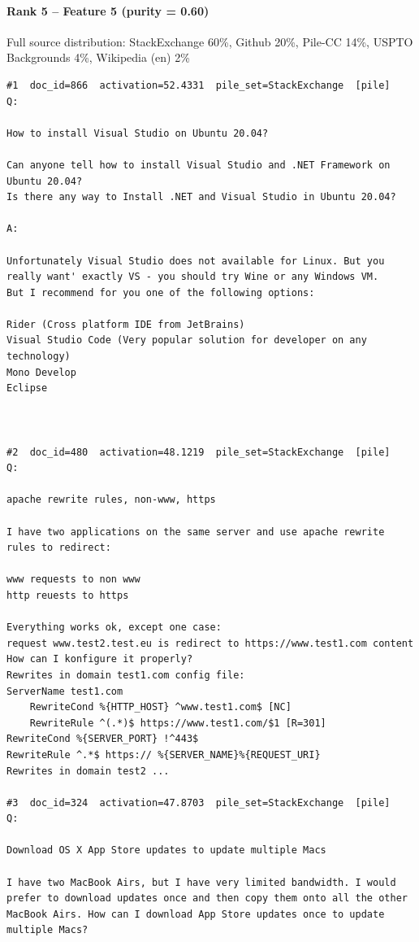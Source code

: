 \paragraph*{Rank 5 -- Feature 5 (purity = 0.60)}

Full source distribution: StackExchange 60\%, Github 20\%, Pile-CC 14\%, USPTO Backgrounds 4\%, Wikipedia (en) 2\%

\begin{verbatim}
#1  doc_id=866  activation=52.4331  pile_set=StackExchange  [pile]
Q:

How to install Visual Studio on Ubuntu 20.04?

Can anyone tell how to install Visual Studio and .NET Framework on Ubuntu 20.04?
Is there any way to Install .NET and Visual Studio in Ubuntu 20.04?

A:

Unfortunately Visual Studio does not available for Linux. But you really want' exactly VS - you should try Wine or any Windows VM.
But I recommend for you one of the following options:

Rider (Cross platform IDE from JetBrains)
Visual Studio Code (Very popular solution for developer on any technology)
Mono Develop
Eclipse



#2  doc_id=480  activation=48.1219  pile_set=StackExchange  [pile]
Q:

apache rewrite rules, non-www, https

I have two applications on the same server and use apache rewrite rules to redirect:

www requests to non www
http reuests to https

Everything works ok, except one case:
request www.test2.test.eu is redirect to https://www.test1.com content
How can I konfigure it properly?
Rewrites in domain test1.com config file: 
ServerName test1.com
    RewriteCond %{HTTP_HOST} ^www.test1.com$ [NC]
    RewriteRule ^(.*)$ https://www.test1.com/$1 [R=301]
RewriteCond %{SERVER_PORT} !^443$
RewriteRule ^.*$ https:// %{SERVER_NAME}%{REQUEST_URI}
Rewrites in domain test2 ...

#3  doc_id=324  activation=47.8703  pile_set=StackExchange  [pile]
Q:

Download OS X App Store updates to update multiple Macs

I have two MacBook Airs, but I have very limited bandwidth. I would prefer to download updates once and then copy them onto all the other MacBook Airs. How can I download App Store updates once to update multiple Macs?


\end{verbatim}
